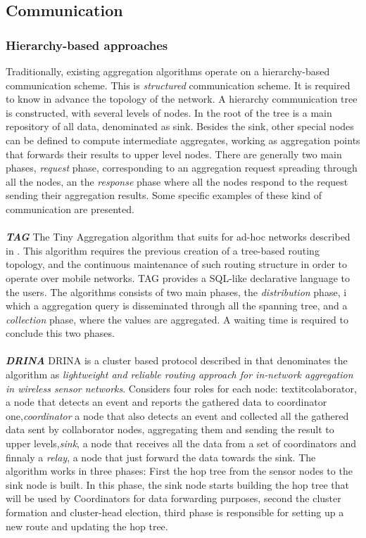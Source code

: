 \subsection{Communication}

\subsubsection{Hierarchy-based approaches} 
Traditionally, existing aggregation algorithms operate on a hierarchy-based communication scheme. This is \textit{structured} communication scheme. It is required to know in advance the topology of the network. A hierarchy communication tree is constructed, with several levels of nodes. In the root of the tree is a main repository of all data, denominated as sink. Besides the sink, other special nodes can be defined to compute intermediate aggregates, working as aggregation points that forwards their results to upper level nodes. There are generally two main phases, \textit{request} phase, corresponding to an aggregation request spreading through all the nodes, an the \textit{response} phase where all the nodes respond to the request sending their aggregation results. Some specific examples of these kind of communication are presented.\\
\\
\textbf{\textit{TAG}} The Tiny Aggregation algorithm that suits for ad-hoc networks described in \cite{madden2002tag}. This algorithm requires the previous creation of a tree-based routing topology, and the continuous maintenance of such routing structure in order to operate over mobile networks. TAG provides a SQL-like declarative language to the users. The algorithms consists of two main phases, the \textit{distribution} phase, i which a aggregation query is disseminated through all the spanning tree, and a \textit{collection} phase, where the values are aggregated. A waiting time is required to conclude this two phases.\\
\\ 
\textbf{\textit{DRINA}} DRINA is a cluster based protocol described in \cite{villas2013drina} that denominates the algorithm as \textit{lightweight and reliable routing approach for in-network aggregation in wireless sensor networks}. Considers four roles for each node: textit{colaborator}, a node that detects an event and reports the gathered data to coordinator one,\textit{coordinator} a node that also detects an event and  collected all the gathered data sent by collaborator nodes, aggregating them and sending the result to upper levels,\textit{sink}, a node that receives all the data from a set of coordinators and finnaly a \textit{relay}, a node that just forward the data towards the sink. The algorithm works in three phases: First the hop tree from the sensor nodes to the sink node is built. In this phase, the sink node starts building the hop tree that will be used by Coordinators for data forwarding purposes, second the cluster formation and cluster-head election, third phase is responsible for setting up a new route and updating the hop tree.\\ \\


